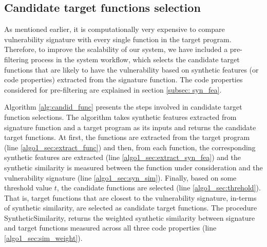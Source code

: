 \subsection{Candidate target functions selection}\label{subsec:pre_fil}

As mentioned earlier, it is computationally very expensive to compare vulnerability signature with every single function in the target program. Therefore, to improve the scalability of our system, we have included a pre-filtering process in the system workflow, which selects the candidate target functions that are likely to have the vulnerability based on synthetic features (or code properties) extracted from the signature function. The code properties considered for pre-filtering are explained in section \ref{subsec: syn_fea}. 

Algorithm \ref{alg:candid_func} presents the steps involved in candidate target function selections. The algorithm takes synthetic features extracted from signature function and a target program as its inputs and returns the candidate target functions. At first, the functions are extracted from the target program (line \ref{algo1_sec:extract_func}) and then, from each function, the corresponding synthetic features are extracted (line \ref{algo1_sec:extract_syn_fea}) and the synthetic similarity is measured between the function under consideration and the vulnerability signature (line \ref{algo1_sec:syn_sim}). Finally, based on some threshold value $t$, the candidate functions are selected (line \ref{algo1_sec:threhold}). That is, target functions that are closest to the vulnerability signature, in-terms of synthetic similarity, are selected as candidate target functions.  The procedure \textsf{SyntheticSimilarity}, returns the weighted synthetic similarity between signature and target functions measured across all three code properties (line \ref{algo1_sec:sim_weight}). 


